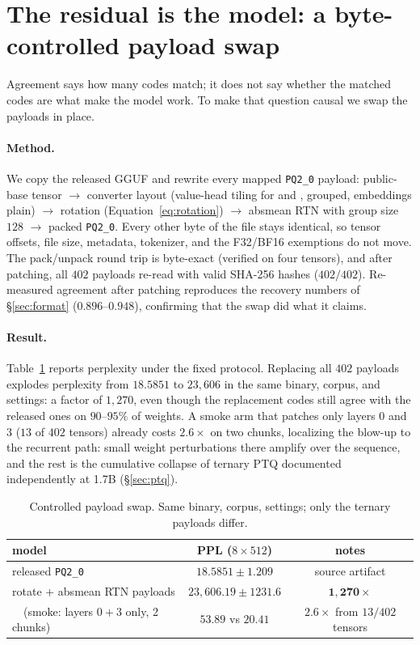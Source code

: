\section{The residual is the model: a byte-controlled payload swap}
\label{sec:residual}

Agreement says how many codes match; it does not say whether the matched codes
are what make the model work. To make that question causal we swap the payloads
in place.

\paragraph{Method.}
We copy the released GGUF and rewrite every mapped \texttt{PQ2\_0} payload:
public-base tensor $\rightarrow$ converter layout (value-head tiling for
 and ,  grouped, embeddings
plain) $\rightarrow$ rotation (Equation~\ref{eq:rotation}) $\rightarrow$
absmean RTN with group size $128$ $\rightarrow$ packed \texttt{PQ2\_0}. Every
other byte of the file stays identical, so tensor offsets, file size, metadata,
tokenizer, and the F32/BF16 exemptions do not move. The pack/unpack round trip
is byte-exact (verified on four tensors), and after patching, all $402$
payloads re-read with valid SHA-256 hashes ($402/402$). Re-measured agreement
after patching reproduces the recovery numbers of \S\ref{sec:format}
($0.896$--$0.948$), confirming that the swap did what it claims.

\paragraph{Result.}
Table~\ref{tab:gate2} reports perplexity under the fixed protocol. Replacing
all $402$ payloads explodes perplexity from $18.5851$ to $23{,}606$ in the same
binary, corpus, and settings: a factor of $1{,}270$, even though the
replacement codes still agree with the released ones on $90$--$95\%$ of
weights. A smoke arm that patches only layers $0$ and $3$ ($13$ of $402$
tensors) already costs $2.6\times$ on two chunks, localizing the blow-up to
the recurrent path: small weight perturbations there amplify over the
sequence, and the rest is the cumulative collapse of ternary PTQ documented
independently at 1.7B (\S\ref{sec:ptq}).

\begin{table}[t]
\caption{Controlled payload swap. Same binary, corpus, settings; only the
ternary payloads differ.}
\label{tab:gate2}
\begin{center}
\begin{tabular}{lcc}
\toprule
model & PPL ($8\times512$) & notes \\
\midrule
released \texttt{PQ2\_0} & $18.5851 \pm 1.209$ & source artifact \\
rotate $+$ absmean RTN payloads & $23{,}606.19 \pm 1231.6$ & $\mathbf{1{,}270\times}$ \\
\ \ (smoke: layers $0{+}3$ only, 2 chunks) & $53.89$ vs $20.41$ & $2.6\times$ from $13/402$ tensors \\
\bottomrule
\end{tabular}
\end{center}
\end{table}

